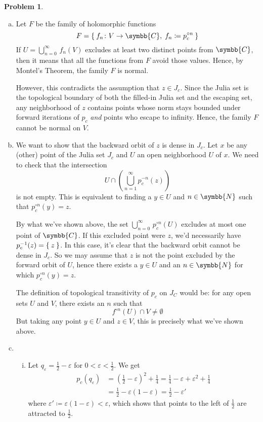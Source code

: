 \documentclass[a4paper, 12pt]{article}
\theoremstyle{definition}
\newtheorem{problem}{Problem}
\newcommand*{\naturals}{\symbb{N}}
\newcommand*{\complex}{\symbb{C}}
\begin{document}
\begin{problem}
~
\begin{enumerate}[a)]
    \item Let \(F\) be the family of holomorphic functions
    \[
        F = \Set{ f_n \colon V \to \complex, \; f_n \coloneq p^{\circ n}_c }
    \]
    If \(U = \bigcup_{n = 0}^{\infty} \, f_n (V)\) excludes at least two distinct points from \(\complex\), then it means that all the functions from \(F\) avoid those values. Hence, by Montel's Theorem, the family \(F\) is normal.

    However, this contradicts the assumption that \(z \in J_c\). Since the Julia set is the topological boundary of both the filled-in Julia set and the escaping set, any neighborhood of \(z\) contains points whose norm stays bounded under forward iterations of \(p_c\) \emph{and} points who escape to infinity. Hence, the family \(F\) cannot be normal on \(V\).

    \item We want to show that the backward orbit of \(z\) is dense in \(J_c\). Let \(x\) be any (other) point of the Julia set \(J_c\) and \(U\) an open neighborhood \(U\) of \(x\). We need to check that the intersection
    \[
        U \cap \left(\bigcup_{n=1}^{\infty} p_c^{-n} (z)\right)
    \]
    is not empty. This is equivalent to finding a \(y \in U\) and \(n \in \naturals\) such that \(p_c^{\circ n} (y) = z\).

    By what we've shown above, the set \(\bigcup_{n = 0}^{\infty} \, p_c^{\circ n} (U)\) excludes at most one point of \(\complex\). If this excluded point were \(z\), we'd necessarily have \(p_c^{-1} (z) = \Set{ z }\). In this case, it's clear that the backward orbit cannot be dense in \(J_c\). So we may assume that \(z\) is not the point excluded by the forward orbit of \(U\), hence there exists a \(y \in U\) and an \(n \in \naturals\) for which \(p_c^{\circ n} (y) = z\).

    The definition of topological transitivity of \(p_c\) on \(J_C\) would be: for any open sets \(U\) and \(V\), there exists an \(n\) such that
    \[
        f^{\circ n}(U) \cap V \neq \emptyset
    \]
    But taking any point \(y \in U\) and \(z \in V\), this is precisely what we've shown above.

    \item
    ~
    \begin{enumerate}[i)]
        \item Let \(q_{\varepsilon} = \frac{1}{2} - \varepsilon\) for \(0 < \varepsilon < \frac{1}{2}\). We get
        \begin{align*}
            p_c \left(q_{\varepsilon}\right) &= \left(\frac{1}{2} - \varepsilon\right)^2 + \frac{1}{4}
            = \frac{1}{4} - \varepsilon + \varepsilon^2 + \frac{1}{4} \\[0.5em]
            &= \frac{1}{2} - \varepsilon(1 - \varepsilon) 
            = \frac{1}{2} - \varepsilon'
        \end{align*}
        where \(\varepsilon' \coloneq \varepsilon (1 - \varepsilon) < \varepsilon\), which shows that points to the left of \(\frac{1}{2}\) are attracted to \(\frac{1}{2}\).
        

\end{enumerate}
\end{enumerate}
\end{problem}
\end{document}

